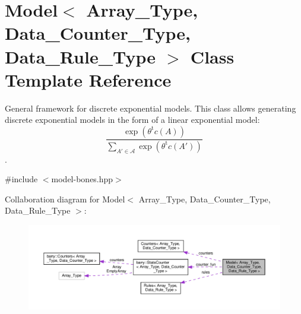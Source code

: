 \hypertarget{class_model}{}\section{Model$<$ Array\+\_\+\+Type, Data\+\_\+\+Counter\+\_\+\+Type, Data\+\_\+\+Rule\+\_\+\+Type $>$ Class Template Reference}
\label{class_model}


General framework for discrete exponential models. This class allows generating discrete exponential models in the form of a linear exponential model\+: \[ \frac{ \exp{\left(\theta^{\mbox{t}}c(A)\right)} }{ \sum_{A'\in \mathcal{A}}\exp{\left(\theta^{\mbox{t}}c(A')\right)} } \].  




{\ttfamily \#include $<$model-\/bones.\+hpp$>$}



Collaboration diagram for Model$<$ Array\+\_\+\+Type, Data\+\_\+\+Counter\+\_\+\+Type, Data\+\_\+\+Rule\+\_\+\+Type $>$\+:\nopagebreak
\begin{figure}[H]
\begin{center}
\leavevmode
\includegraphics[width=350pt]{class_model__coll__graph}
\end{center}
\end{figure}
